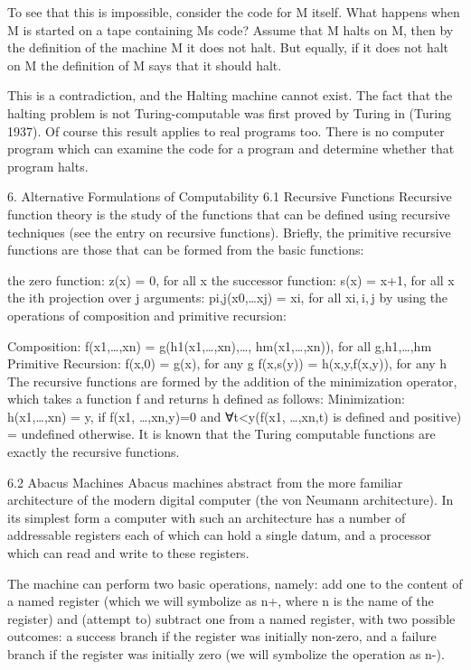 To see that this is impossible, consider the code for M itself. What happens when M is started on a tape containing Ms code? Assume that M halts on M, then by the definition of the machine M it does not halt. But equally, if it does not halt on M the definition of M says that it should halt.

This is a contradiction, and the Halting machine cannot exist. The fact that the halting problem is not Turing-computable was first proved by Turing in (Turing 1937). Of course this result applies to real programs too. There is no computer program which can examine the code for a program and determine whether that program halts.

6. Alternative Formulations of Computability
6.1 Recursive Functions
Recursive function theory is the study of the functions that can be defined using recursive techniques (see the entry on recursive functions). Briefly, the primitive recursive functions are those that can be formed from the basic functions:

the zero function:	z(x)	=	0,	for all x
the successor function:	s(x)	=	x+1,	for all x
the ith projection over j arguments:	pi,j(x0,…xj)	=	xi,	for all xi, i, j
by using the operations of composition and primitive recursion:

Composition:			
f(x1,…,xn)	=	g(h1(x1,…,xn),…, hm(x1,…,xn)),	for all g,h1,…,hm
Primitive Recursion:			
f(x,0)	=	g(x),	for any g
f(x,s(y))	=	h(x,y,f(x,y)),	for any h
The recursive functions are formed by the addition of the minimization operator, which takes a function f and returns h defined as follows:
Minimization:		
h(x1,…,xn)	=	y, if f(x1, …,xn,y)=0 and ∀t<y(f(x1, …,xn,t) is defined and positive)
=	undefined otherwise.
It is known that the Turing computable functions are exactly the recursive functions.

6.2 Abacus Machines
Abacus machines abstract from the more familiar architecture of the modern digital computer (the von Neumann architecture). In its simplest form a computer with such an architecture has a number of addressable registers each of which can hold a single datum, and a processor which can read and write to these registers.

The machine can perform two basic operations, namely: add one to the content of a named register (which we will symbolize as n+, where n is the name of the register) and (attempt to) subtract one from a named register, with two possible outcomes: a success branch if the register was initially non-zero, and a failure branch if the register was initially zero (we will symbolize the operation as n-).

